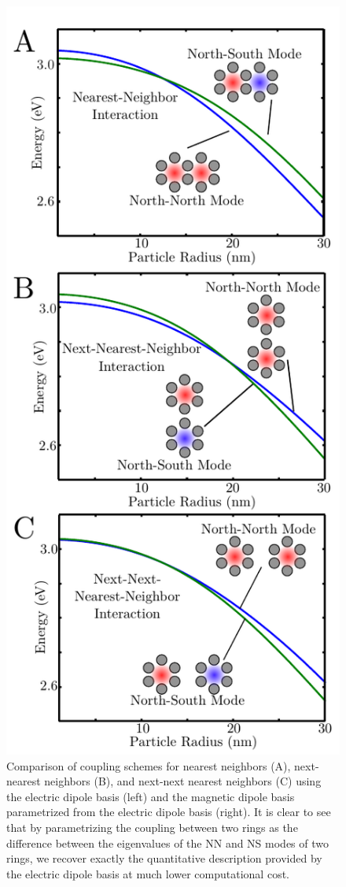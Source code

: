 \documentclass[journal=apchd5,manuscript=article]{achemso}
\begin{document}
\begin{figure}
\begin{center}
\includegraphics{coupling_comparison.pdf}
\caption{Comparison of coupling schemes for nearest neighbors (A), next-nearest neighbors (B), and next-next nearest neighbors (C) using the electric dipole basis (left) and the magnetic dipole basis parametrized from the electric dipole basis (right). It is clear to see that by parametrizing the coupling between two rings as the difference between the eigenvalues of the NN and NS modes of two rings, we recover exactly the quantitative description provided by the electric dipole basis at much lower computational cost.}
\label{ring_spacing}
\end{center}
\end{figure}
\end{document}

